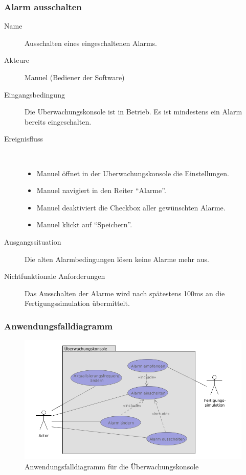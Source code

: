 \documentclass[parskip=full]{scrartcl}
\begin{document}
\subsubsection{Alarm ausschalten}
\begin{description}
  \item[Name] Ausschalten eines eingeschaltenen Alarms.
  \item[Akteure] Manuel (Bediener der Software)
  \item[Eingangsbedingung] Die \gls{Uberwachungskonsole} ist in Betrieb. Es ist mindestens ein Alarm bereits eingeschalten.
  \item[Ereignisfluss]~\\
  \begin{itemize}[noitemsep]
    \item Manuel \"offnet in der \gls{Uberwachungskonsole} die Einstellungen.
    \item Manuel navigiert in den Reiter "`Alarme"'.
    \item Manuel deaktiviert die Checkbox aller gew\"unschten Alarme.
    \item Manuel klickt auf "`Speichern"'.
  \end{itemize}
  \item[Ausgangssituation] Die alten Alarmbedingungen l\"osen keine Alarme mehr aus.
  \item [Nichtfunktionale Anforderungen] Das Ausschalten der Alarme wird nach sp\"atestens 100ms an die \gls{Fertigungssimulation} \"ubermittelt.
\end{description}

\subsubsection{Anwendungsfalldiagramm}
\begin{figure}[h]
  \centering
  \includegraphics[scale=0.62]{media/UseCases/Ueberwachungskonsole.png}
  \caption{Anwendungsfalldiagramm für die Überwachungskonsole}
\end{figure}
\end{document}
